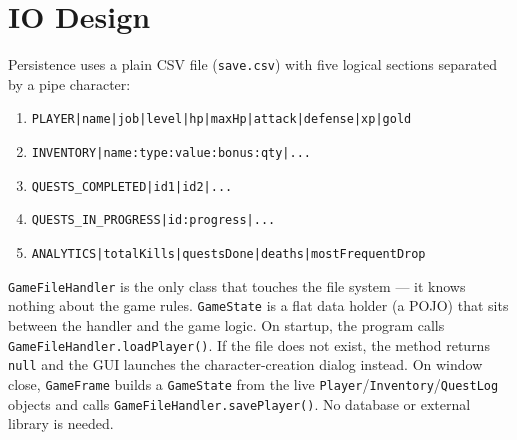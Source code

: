 \documentclass[12pt,a4paper]{article}
\begin{document}
\section{IO Design}

Persistence uses a plain CSV file (\texttt{save.csv}) with five logical sections separated by a pipe character:

\begin{enumerate}[leftmargin=*]
    \item \texttt{PLAYER|name|job|level|hp|maxHp|attack|defense|xp|gold}
    \item \texttt{INVENTORY|name:type:value:bonus:qty|...}
    \item \texttt{QUESTS\_COMPLETED|id1|id2|...}
    \item \texttt{QUESTS\_IN\_PROGRESS|id:progress|...}
    \item \texttt{ANALYTICS|totalKills|questsDone|deaths|mostFrequentDrop}
\end{enumerate}

\texttt{GameFileHandler} is the only class that touches the file system --- it knows nothing about the game rules. \texttt{GameState} is a flat data holder (a POJO) that sits between the handler and the game logic. On startup, the program calls \texttt{GameFileHandler.loadPlayer()}. If the file does not exist, the method returns \texttt{null} and the GUI launches the character-creation dialog instead. On window close, \texttt{GameFrame} builds a \texttt{GameState} from the live \texttt{Player}/\texttt{Inventory}/\texttt{QuestLog} objects and calls \texttt{GameFileHandler.savePlayer()}. No database or external library is needed.

\end{document}
